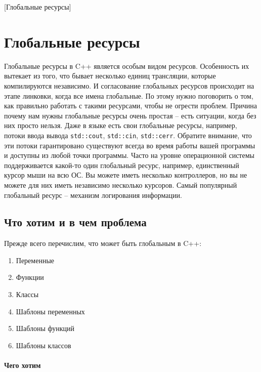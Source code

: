 [Глобальные ресурсы]


\section{Глобальные ресурсы}
\label{section::Global}

Глобальные ресурсы в C++ является особым видом ресурсов.
Особенность их вытекает из того, что бывает несколько единиц трансляции, которые компилируются независимо.
И согласование глобальных ресурсов происходит на этапе линковки, когда все имена глобальные.
По этому нужно поговорить о том, как правильно работать с такими ресурсами, чтобы не огрести проблем.
Причина почему нам нужны глобальные ресурсы очень простая -- есть ситуации, когда без них просто нельзя.
Даже в языке есть свои глобальные ресурсы, например, потоки ввода вывода \verb"std::cout", \verb"std::cin", \verb"std::cerr".
Обратите внимание, что эти потоки гарантировано существуют всегда во время работы вашей программы и доступны из любой точки программы.
Часто на уровне операционной системы поддерживается какой-то один глобальный ресурс, например, единственный курсор мыши на всю ОС.
Вы можете иметь несколько контроллеров, но вы не можете для них иметь независимо несколько курсоров.
Самый популярный глобальный ресурс -- механизм логирования информации.

\subsection{Что хотим и в чем проблема}

Прежде всего перечислим, что может быть глобальным в C++:
\begin{enumerate}
\item Переменные

\item Функции

\item Классы

\item Шаблоны переменных

\item Шаблоны функций

\item Шаблоны классов
\end{enumerate}

\paragraph{Чего хотим}

